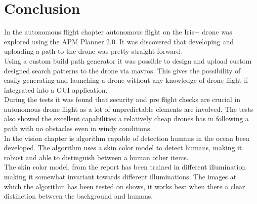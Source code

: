 \chapter{Conclusion}

In the autonomous flight chapter autonomous flight on the Iris+ drone was explored using the APM Planner 2.0. It was discovered that developing and uploading a path to the drone was pretty straight forward.\\

Using a custom build path generator it was possible to design and upload custom designed search patterns to the drone via mavros. This gives the possibility of easily generating and launching a drone without any knowledge of drone flight if integrated into a GUI application.\\

During the tests it was found that security and pre flight checks are crucial in autonomous drone flight as a lot of unpredictable elements are involved. The tests also showed the excellent capabilities a relatively cheap drones has in following a path with no obstacles even in windy conditions.\\

In the vision chapter  is  algorithm capable of detection humans in the ocean been developed.  The algorithm uses a skin color model to detect humans, making it robust and able to distinguish between a human other items.\\
 
The skin color model, from the report \cite{Ref:SkinDetection} has been trained in different illumination making it somewhat invariant towards different illuminations. The images at which the algorithm has been tested on shows, it works best when there a clear distinction between the background and humans.
\newpage